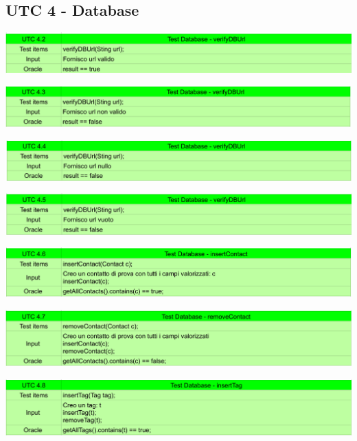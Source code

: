 \subsection{UTC 4 - Database}
\begin{center} \includegraphics[width=\linewidth]{images/UTC/4.2.png} \end{center}
\begin{center} \includegraphics[width=\linewidth]{images/UTC/4.3.png} \end{center}
\begin{center} \includegraphics[width=\linewidth]{images/UTC/4.4.png} \end{center}
\begin{center} \includegraphics[width=\linewidth]{images/UTC/4.5.png} \end{center}
\begin{center} \includegraphics[width=\linewidth]{images/UTC/4.6.png} \end{center}
\begin{center} \includegraphics[width=\linewidth]{images/UTC/4.7.png} \end{center}
\begin{center} \includegraphics[width=\linewidth]{images/UTC/4.8.png} \end{center}
